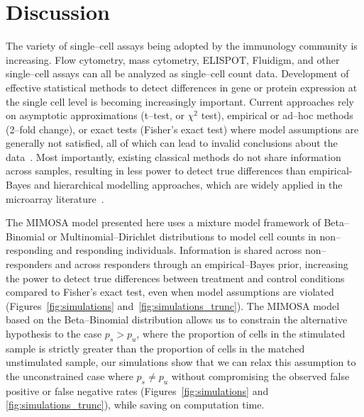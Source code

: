 \documentclass[11pt]{article}
\begin{document}
\section{Discussion}
The variety of single--cell assays being adopted by the immunology community is increasing. Flow cytometry, mass cytometry, ELISPOT, Fluidigm, and other single--cell assays can all be analyzed as single--cell count data. Development of effective statistical methods to detect differences in gene or protein expression at the single cell level is becoming increasingly important. Current approaches rely on asymptotic approximations (t--test, or $\chi^2$ test), empirical or ad--hoc methods (2--fold change), or exact tests (Fisher's exact test) where model assumptions are generally not satisfied, all of which can lead to invalid conclusions about the data~\cite{Dittrich:2012bv,Trigona:2003,Sinclair:2004hs,Horton:2007tsa,Proschan:2009ks}. Most importantly, existing classical methods do not share information across samples, resulting in less power to detect true differences than empirical-Bayes and hierarchical modelling approaches, which are widely applied in the microarray literature~\cite{Kendziorski:2003uw,Newton:2001go,Smyth:2005iy}. 

The MIMOSA model presented here uses a mixture model framework of Beta--Binomial or Multinomial--Dirichlet distributions to model cell counts in non--responding and responding individuals. Information is shared across non--responders and across responders through an empirical--Bayes prior, increasing the power to detect true differences between treatment and control conditions compared to Fisher's exact test, even when model assumptions are violated (Figures~\ref{fig:simulations} and~\ref{fig:simulations_trunc}). The MIMOSA model based on the Beta--Binomial distribution allows us to constrain the alternative hypothesis to the case $p_s > p_u$, where the proportion of cells in the stimulated sample is strictly greater than the proportion of cells in the matched unstimulated sample, our simulations show that we can relax this assumption to the unconstrained case where $p_s\ne p_u$ without compromising the observed false positive or false negative rates (Figures~\ref{fig:simulations} and \ref{fig:simulations_trunc}), while saving on computation time.
\end{document}
